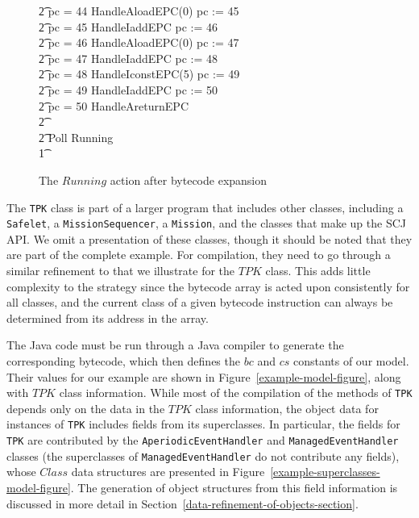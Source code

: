 \begin{figure}[tp!]
\begin{minipage}{0.5\textwidth}
{\begin{circus}
    \t2 {} \circelse pc = 44 \circthen HandleAloadEPC(0) \circseq pc := 45 \\
    \t2 {} \circelse pc = 45 \circthen HandleIaddEPC \circseq pc := 46 \\
    \t2 {} \circelse pc = 46 \circthen HandleAloadEPC(0) \circseq pc := 47 \\
    \t2 {} \circelse pc = 47 \circthen HandleIaddEPC \circseq pc := 48 \\
    \t2 {} \circelse pc = 48 \circthen HandleIconstEPC(5) \circseq pc := 49 \\
    \t2 {} \circelse pc = 49 \circthen HandleIaddEPC \circseq pc := 50 \\
    \t2 {} \circelse pc = 50 \circthen HandleAreturnEPC \\
    \t2 {} \cdots {} \\
    \t2 \circfi \circseq Poll \circseq Running \\
    \t1 \circfi
  \end{circus}
  }
  \end{minipage}
  \normalsize
  \caption{The $Running$ action after bytecode expansion}
  \label{bytecode-expansion-example-figure}
\end{figure}

The \texttt{TPK} class is part of a larger program that includes other
classes, including a \texttt{Safelet}, a \texttt{MissionSequencer}, a
\texttt{Mission}, and the classes that make up the SCJ API.
We omit a presentation of these classes, though it should be noted
that they are part of the complete example.
For compilation, they need to go through a similar refinement to that
we illustrate for the $TPK$ class.
This adds little complexity to the strategy since the bytecode array
is acted upon consistently for all classes, and the current class of a
given bytecode instruction can always be determined from its address
in the array.

The Java code must be run through a Java compiler to generate the
corresponding bytecode, which then defines the $bc$ and $cs$ constants
of our model.
Their values for our example are shown in
Figure~\ref{example-model-figure}, along with $TPK$ class
information.
While most of the compilation of the methods of \texttt{TPK} depends
only on the data in the $TPK$ class information, the object data for
instances of \texttt{TPK} includes fields from its superclasses.
In particular, the fields for \texttt{TPK} are contributed by the
\texttt{AperiodicEventHandler} and \texttt{ManagedEventHandler}
classes (the superclasses of \texttt{ManagedEventHandler} do not
contribute any fields), whose $Class$ data structures are presented in
Figure~\ref{example-superclasses-model-figure}.
The generation of object structures from this field information is
discussed in more detail in
Section~\ref{data-refinement-of-objects-section}.

